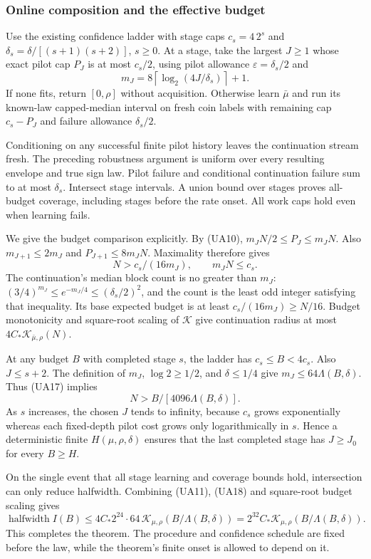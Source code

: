 \subsubsection{Online composition and the effective budget}

Use the existing confidence ladder with stage caps $c_s=4\,2^s$ and
$\delta_s=\delta/[(s+1)(s+2)]$, $s\ge0$. At a stage, take the largest $J\ge1$
whose exact pilot cap $P_J$ is at most $c_s/2$, using pilot allowance
$\varepsilon=\delta_s/2$ and
\[
 m_J=8\left\lceil\log_2(4J/\delta_s)\right\rceil+1.
\]
If none fits, return $[0,\rho]$ without acquisition. Otherwise learn
$\bar\mu$ and run its known-law capped-median interval on fresh coin labels
with remaining cap $c_s-P_J$ and failure allowance $\delta_s/2$.

Conditioning on any successful finite pilot history leaves the continuation
stream fresh. The preceding robustness argument is uniform over every
resulting envelope and true
sign law. Pilot failure and conditional continuation failure sum to at most
$\delta_s$. Intersect stage intervals. A union bound over stages proves
all-budget coverage, including stages before the rate onset. All work caps
hold even when learning fails.

We give the budget comparison explicitly. By (UA10),
$m_JN/2\le P_J\le m_JN$. Also $m_{J+1}\le2m_J$ and
$P_{J+1}\le8m_JN$. Maximality therefore gives
\[
 N>c_s/(16m_J),\qquad m_JN\le c_s.                    \tag{UA17}
\]
The continuation's median block count is no greater than $m_J$:
$(3/4)^{m_J}\le e^{-m_J/4}\le(\delta_s/2)^2$, and the count is the least
odd integer satisfying that inequality. Its base expected budget is at
least $c_s/(16m_J)\ge N/16$. Budget monotonicity and square-root scaling of
$\mathcal K$ give continuation radius at most $4C_*\mathcal K_{\bar\mu,\rho}(N)$.

At any budget $B$ with completed stage $s$, the ladder has
$c_s\le B<4c_s$. Also $J\le s+2$. The definition of $m_J$,
$\log2\ge1/2$, and $\delta\le1/4$ give
$m_J\le64\Lambda(B,\delta)$. Thus (UA17) implies
\[
 N>B/[4096\Lambda(B,\delta)].                          \tag{UA18}
\]
As $s$ increases, the chosen $J$ tends to infinity, because $c_s$ grows
exponentially whereas each fixed-depth pilot cost grows only logarithmically
in $s$. Hence a deterministic finite $H(\mu,\rho,\delta)$ ensures that the
last completed stage has $J\ge J_0$ for every $B\ge H$.

On the single event that all stage learning and coverage bounds hold,
intersection can only reduce halfwidth. Combining (UA11), (UA18) and
square-root budget scaling gives
\[
 \operatorname{halfwidth}I(B)
 \le4C_*2^{24}\cdot64\,
 \mathcal K_{\mu,\rho}(B/\Lambda(B,\delta))
 =2^{32}C_*\mathcal K_{\mu,\rho}(B/\Lambda(B,\delta)).
\]
This completes the theorem. The procedure and confidence schedule are fixed
before the law, while the theorem's finite onset is allowed to depend on it.

